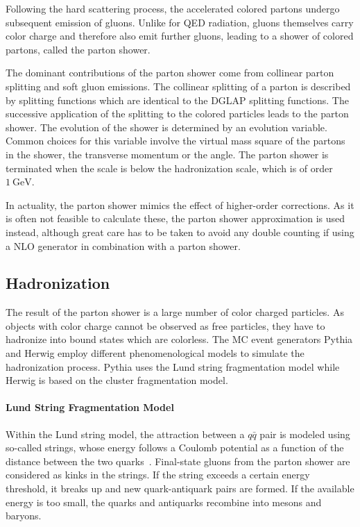 Following the hard scattering process, the accelerated colored partons undergo
subsequent emission of gluons. Unlike for QED radiation, gluons themselves carry
color charge and therefore also emit further gluons, leading to a shower of
colored partons, called the parton shower.

The dominant contributions of the parton shower  come from collinear parton
splitting and soft gluon emissions. The collinear splitting of a parton is
described by splitting functions which are identical to the DGLAP splitting
functions. The successive application of the splitting to the colored particles
leads to the parton shower. The evolution of the shower is determined by an
evolution variable. Common choices for this variable  involve the virtual mass square of the
partons in the shower, the transverse momentum or the angle. The parton shower
is terminated when the scale is below the hadronization scale, which is of order
$\SI{1}{\GeV}$.

In actuality, the parton shower mimics the effect of higher-order corrections. As
it is often not feasible to calculate these, the parton shower approximation is
used instead, although great care has to be taken to avoid any double counting if
using a NLO generator in combination with a parton shower.

\subsection{Hadronization}

The result of the parton shower is a large number of color charged particles. As
objects with color charge cannot be observed as free particles, they have to
hadronize into bound states which are colorless. The MC event generators Pythia
and Herwig employ different phenomenological models to simulate the
hadronization process. Pythia uses the Lund string fragmentation model while
Herwig is based on the cluster fragmentation model.

\paragraph{Lund String Fragmentation Model}

Within the Lund string model, the attraction between a $q\bar q$ pair is
modeled using so-called strings, whose energy follows a Coulomb potential as a function
of the distance between the two quarks~\cite{Sjostrand:1984ic}. Final-state gluons from the parton
shower are considered as kinks in the strings. If the string exceeds a certain
energy threshold, it breaks up and new quark-antiquark pairs are formed. If the
available energy is too small, the quarks and antiquarks recombine into mesons
and baryons.


